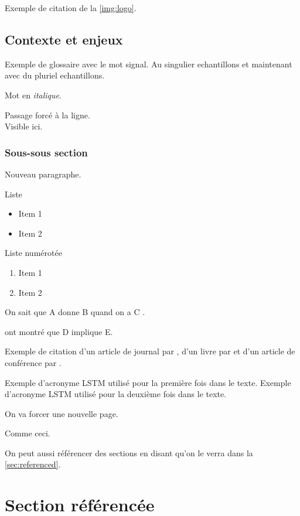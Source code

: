 \documentclass[a4paper]{article}
\begin{document}
Exemple de citation de la \autoref{img:logo}.

\subsection{Contexte et enjeux}

Exemple de glossaire avec le mot \gls{signal}.
Au singulier \glspl{echantillon} et maintenant avec du pluriel \glspl{echantillon}.

Mot en \textit{italique}.

Passage forcé à la ligne.\\
Visible ici.

\subsubsection{Sous-sous section}

\par Nouveau paragraphe.

Liste
\begin{itemize}
    \item Item 1
    \item Item 2
\end{itemize}

Liste numérotée
\begin{enumerate}
    \item Item 1
    \item Item 2
\end{enumerate}

On sait que A donne B quand on a C \citep{Bracewell1986}.

\cite{Bracewell1986} ont montré que D implique E.

Exemple de citation d'un article de journal par \cite{Bracewell1986}, d'un livre par \cite{Bracewell1986} et d'un article de conférence par \cite{Bracewell1986}.

Exemple d'acronyme \ac{LSTM} utilisé pour la première fois dans le texte.
Exemple d'acronyme \ac{LSTM} utilisé pour la deuxième fois dans le texte.

On va forcer une nouvelle page.

\newpage

Comme ceci.

On peut aussi référencer des sections en disant qu'on le verra dans la \autoref{sec:referenced}.

\section{Section référencée}
\label{sec:referenced}
\end{document}
